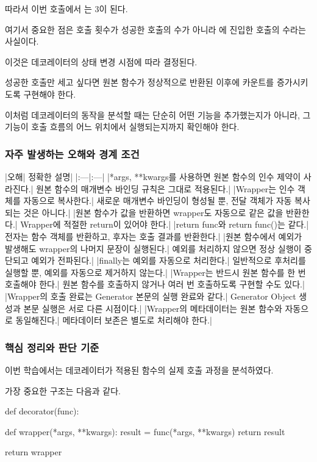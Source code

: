 따라서 이번 호출에서 는 3이 된다.

여기서 중요한 점은 호출 횟수가 성공한 호출의 수가 아니라 에 진입한 호출의 수라는 사실이다.

이것은 데코레이터의 상태 변경 시점에 따라 결정된다.

성공한 호출만 세고 싶다면 원본 함수가 정상적으로 반환된 이후에 카운트를 증가시키도록 구현해야 한다.

이처럼 데코레이터의 동작을 분석할 때는 단순히 어떤 기능을 추가했는지가 아니라, 그 기능이 호출 흐름의 어느 위치에서 실행되는지까지 확인해야 한다.

\subsubsection{자주 발생하는 오해와 경계 조건}

\begin{dhktable}
|오해|	정확한 설명|
|:---|:---|
|*args, **kwargs를 사용하면 원본 함수의 인수 제약이 사라진다.|	원본 함수의 매개변수 바인딩 규칙은 그대로 적용된다.|
|Wrapper는 인수 객체를 자동으로 복사한다.|	새로운 매개변수 바인딩이 형성될 뿐, 전달 객체가 자동 복사되는 것은 아니다.|
|원본 함수가 값을 반환하면 wrapper도 자동으로 같은 값을 반환한다.|	Wrapper에 적절한 return이 있어야 한다.|
|return func와 return func()는 같다.|	전자는 함수 객체를 반환하고, 후자는 호출 결과를 반환한다.|
|원본 함수에서 예외가 발생해도 wrapper의 나머지 문장이 실행된다.|	예외를 처리하지 않으면 정상 실행이 중단되고 예외가 전파된다.|
|finally는 예외를 자동으로 처리한다.|	일반적으로 후처리를 실행할 뿐, 예외를 자동으로 제거하지 않는다.|
|Wrapper는 반드시 원본 함수를 한 번 호출해야 한다.|	원본 함수를 호출하지 않거나 여러 번 호출하도록 구현할 수도 있다.|
|Wrapper의 호출 완료는 Generator 본문의 실행 완료와 같다.|	Generator Object 생성과 본문 실행은 서로 다른 시점이다.|
|Wrapper의 메타데이터는 원본 함수와 자동으로 동일해진다.|	메타데이터 보존은 별도로 처리해야 한다.|
\end{dhktable}

\subsubsection{핵심 정리와 판단 기준}

이번 학습에서는 데코레이터가 적용된 함수의 실제 호출 과정을 분석하였다.

가장 중요한 구조는 다음과 같다.

\begin{dhkcode}
def decorator(func):

    def wrapper(*args, **kwargs):
        result = func(*args, **kwargs)
        return result

    return wrapper
\end{dhkcode}

